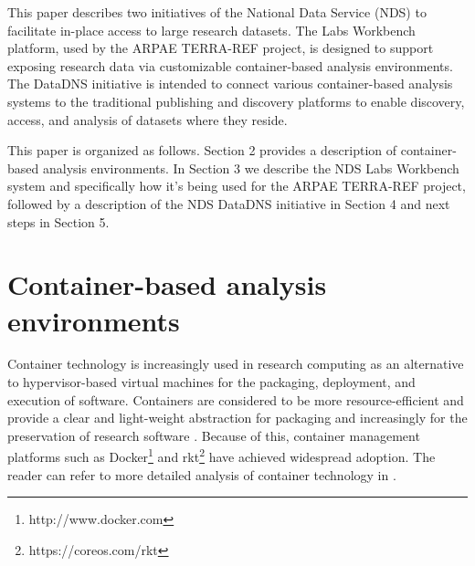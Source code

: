 \documentclass{sig-alternate}
\begin{document}
This paper describes two initiatives of the National Data Service (NDS) to facilitate in-place access to large research datasets. The Labs Workbench platform, used by the ARPAE TERRA-REF project, is designed to support exposing research data via customizable container-based analysis environments.  The DataDNS initiative is intended to connect various container-based analysis systems to the traditional publishing and discovery platforms to enable discovery, access, and analysis of datasets where they reside.




This paper is organized as follows.  Section 2 provides a description of container-based analysis environments.  In Section 3 we describe the NDS Labs Workbench system and specifically how it's being used for the ARPAE TERRA-REF project, followed by a description of the NDS DataDNS initiative in Section 4 and next steps in Section 5.



\section{Container-based analysis environments}

Container technology is increasingly used in research computing as an alternative to hypervisor-based virtual machines for the packaging, deployment, and execution of software. Containers are considered to be more resource-efficient and provide a clear and light-weight abstraction for packaging and increasingly for the preservation of research software \cite{Meng2015137}.  Because of this, container management platforms such as Docker\footnote{http://www.docker.com} and rkt\footnote{https://coreos.com/rkt} have achieved widespread adoption. The reader can refer to more detailed analysis of container technology in \cite{Soltesz:2007:COS:1272998.1273025,7095802,7036275}.
\end{document}
